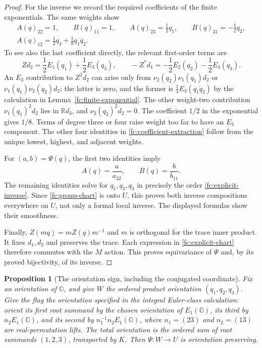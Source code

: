 \documentclass[11pt]{article}
\newtheorem{proposition}[theorem]{Proposition}
\theoremstyle{definition}
\begin{document}
\begin{proof}
For the inverse we record the required coefficients of the finite
exponentials. The same weights show
\begin{equation}
 \begin{gathered}
 A(q)_{22}=1,\qquad B(q)_{11}=1,\qquad
 A(q)_{23}=\frac12q_1,\qquad
 B(q)_{31}=-\frac12q_2,\\
 A(q)_{12}=\frac12q_3+\frac18\overline{q_1q_2}.
 \label{fc:coefficient-extraction}
 \end{gathered}
\end{equation}
To see also the last coefficient directly, the relevant first-order
terms are
\[
 Zd_2=\frac12E_1(q_1)+\frac12E_3(q_3),\qquad
 -Z^*d_1=-\frac12E_2(q_2)-\frac12E_3(q_3).
\]
An $E_3$ contribution to $Z^2d_2$ can arise only from
$\nu_2(q_2)\nu_1(q_1)d_2$ or
$\nu_1(q_1)\nu_2(q_2)d_2$; the latter is zero, and the former
is $\frac14E_3(\overline{q_1q_2})$ by the calculation in
Lemma~\ref{fc:finite-exponential}. The other weight-two
contribution $\nu_1(q_1)^2d_2$ lies in $\mathbb R d_3$,
and $\nu_2(q_2)^2d_2=0$. The coefficient $1/2$ in the
exponential gives $1/8$. Terms of degree three or four raise
weight too far to have an $E_3$ component. The other four
identities in \eqref{fc:coefficient-extraction} follow from
the unique lowest, highest, and adjacent weights.

For $(a,b)=\Psi(q)$, the first two identities imply
\[
 A(q)=\frac{a}{a_{22}},\qquad
 B(q)=\frac{b}{b_{11}}.
\]
The remaining identities solve for $q_1,q_2,q_3$ in precisely
the order \eqref{fc:explicit-inverse}. Since
\eqref{fc:group-chart} is onto $U$, this proves both inverse
compositions everywhere on $U$, not only a formal local inverse.
The displayed formulas show their smoothness.

Finally, $Z(mq)=mZ(q)m^{-1}$ and $m$ is orthogonal for the
trace inner product. It fixes $d_1,d_2$ and preserves the trace.
Each expression in \eqref{fc:explicit-chart} therefore
commutes with the $M$ action. This proves equivariance of $\Psi$
and, by its proved bijectivity, of its inverse.
\end{proof}

\begin{proposition}[The orientation sign, including the conjugated coordinate]
\label{fc:orientation}
Fix an orientation of $\mathbb O$, and give $W$ the ordered product
orientation $(q_1,q_2,q_3)$. Give the flag the orientation specified
in the integral Euler-class calculation: orient its first root
summand by the chosen orientation of $E_1(\mathbb O)$, its third
by $n_2E_1(\mathbb O)$, and its second by
$n_1^{-1}n_2E_1(\mathbb O)$, where $n_1=(23)$ and $n_2=(13)$
are real-permutation lifts. The total orientation is the ordered
sum of root summands $(1,2,3)$, transported by $K$.
Then $\Psi:W\to U$ is orientation preserving.
\end{proposition}
\end{document}

